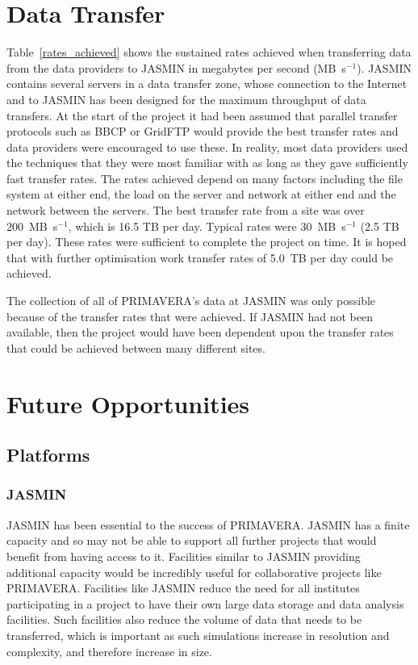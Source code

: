 \documentclass[gmd, manuscript]{copernicus}
\begin{document}
\section{Data Transfer}
\label{transfer_rates}

Table~\ref{rates_achieved} shows the sustained rates achieved when transferring data from the data providers to JASMIN in megabytes per second (MB~s$^{-1}$). JASMIN contains several servers in a data transfer zone, whose connection to the Internet and to JASMIN has been designed for the maximum throughput of data transfers. At the start of the project it had been assumed that parallel transfer protocols such as BBCP or GridFTP would provide the best transfer rates and data providers were encouraged to use these. In reality, most data providers used the techniques that they were most familiar with as long as they gave sufficiently fast transfer rates. The rates achieved depend on many factors including the file system at either end, the load on the server and network at either end and the network between the servers. The best transfer rate from a site was over 200~MB~s$^{-1}$, which is 16.5 TB per day. Typical rates were 30~MB~s$^{-1}$ (2.5 TB per day). These rates were sufficient to complete the project on time. It is hoped that with further optimisation work transfer rates of 5.0~TB per day could be achieved.

The collection of all of PRIMAVERA's data at JASMIN was only possible because of the transfer rates that were achieved. If JASMIN had not been available, then the project would have been dependent upon the transfer rates that could be achieved between many different sites.


\section{Future Opportunities}

\subsection{Platforms}

\subsubsection{JASMIN}
JASMIN has been essential to the success of PRIMAVERA. JASMIN has a finite capacity and so may not be able to support all further projects that would benefit from having access to it. Facilities similar to JASMIN providing additional capacity would be incredibly useful for collaborative projects like PRIMAVERA. Facilities like JASMIN reduce the need for all institutes participating in a project to have their own large data storage and data analysis facilities. Such facilities also reduce the volume of data that needs to be transferred, which is important as such simulations increase in resolution and complexity, and therefore increase in size.
\end{document}
